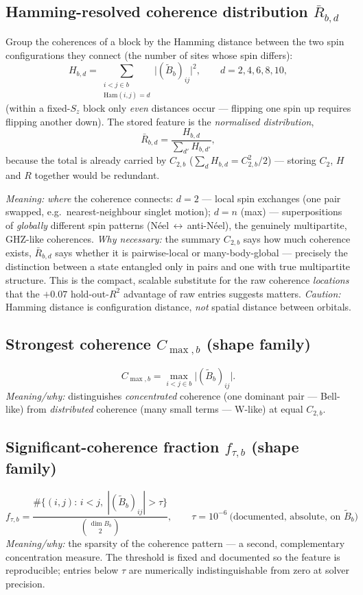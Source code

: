 \documentclass[11pt]{article}
\newcommand{\Bb}{\ensuremath{B_b}}
\newcommand{\Bt}{\ensuremath{\widetilde B_b}}
\begin{document}
\subsection{Hamming-resolved coherence distribution $\bar R_{b,d}$}
Group the coherences of a block by the Hamming distance between the two spin
configurations they connect (the number of sites whose spin differs):
\[
  H_{b,d}=\sum_{\substack{i<j\in b\\ \mathrm{Ham}(i,j)=d}}
          \big|(\Bt)_{ij}\big|^{2},
  \qquad d=2,4,6,8,10 ,
\]
(within a fixed-$S_z$ block only \emph{even} distances occur --- flipping one
spin up requires flipping another down). The stored feature is the
\emph{normalised distribution},
\[
  \bar R_{b,d}=\frac{H_{b,d}}{\sum_{d'}H_{b,d'}} ,
\]
because the total is already carried by $C_{2,b}$
($\sum_d H_{b,d}=C_{2,b}^2/2$) --- storing $C_2$, $H$ and $R$ together would
be redundant.

\emph{Meaning:} \emph{where} the coherence connects: $d=2$ --- local spin
exchanges (one pair swapped, e.g.\ nearest-neighbour singlet motion);
$d=n$ (max) --- superpositions of \emph{globally} different spin patterns
(N\'eel$\,\leftrightarrow\,$anti-N\'eel), the genuinely multipartite,
GHZ-like coherences. \emph{Why necessary:} the summary $C_{2,b}$ says how
much coherence exists, $\bar R_{b,d}$ says whether it is pairwise-local or
many-body-global --- precisely the distinction between a state entangled
only in pairs and one with true multipartite structure. This is the compact,
scalable substitute for the raw coherence \emph{locations} that the
$+0.07$ hold-out-$R^2$ advantage of raw entries suggests matters.
\emph{Caution:} Hamming distance is configuration distance, \emph{not}
spatial distance between orbitals.

\subsection{Strongest coherence $C_{\max,b}$ (shape family)}
\[
  C_{\max,b}=\max_{i<j\in b}\big|(\Bt)_{ij}\big| .
\]
\emph{Meaning/why:} distinguishes \emph{concentrated} coherence (one
dominant pair --- Bell-like) from \emph{distributed} coherence (many small
terms --- W-like) at equal $C_{2,b}$.

\subsection{Significant-coherence fraction $f_{\tau,b}$ (shape family)}
\[
  f_{\tau,b}=\frac{\#\{(i,j):\,i<j,\;|(\Bt)_{ij}|>\tau\}}
                  {\binom{\dim\Bb}{2}},
  \qquad
  \boxed{\tau=10^{-6}\ \text{(documented, absolute, on }\Bt\text{)}}
\]
\emph{Meaning/why:} the sparsity of the coherence pattern --- a second,
complementary concentration measure. The threshold is fixed and documented
so the feature is reproducible; entries below $\tau$ are numerically
indistinguishable from zero at solver precision.
\end{document}
